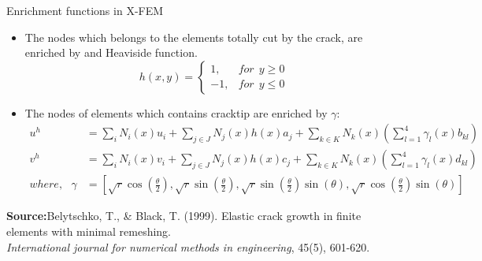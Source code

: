 \documentclass{beamer}
\begin{document}
\begin{frame}[t,fragile]{Enrichment functions in X-FEM}
    \vspace{-.3cm}
     \footnotesize
    \begin{itemize}
        \item The nodes which belongs to the elements totally cut by the crack, are enriched by and Heaviside function.
    $$h(x,y)=\begin{cases}1,&       for ~ ~ y\ge 0\\ -1,&       for~ ~ y\le 0\end{cases}$$
\item The nodes of elements which contains cracktip are enriched by $\gamma$:
     \footnotesize
    \begin{align*}
     u^h&=\sum_i N_i(x)u_i+\sum_{j\in J} N_j(x) h(x)a_j+\sum_{k\in K} N_k(x)\left( \sum_{l=1}^{4}\gamma_l(x)b_{kl} \right) \\
    v^h&=\sum_i N_i(x)v_i+\sum_{j\in J} N_j(x) h(x)c_j+\sum_{k\in K} N_k(x)\left( \sum_{l=1}^{4}\gamma_l(x)d_{kl} \right) \\ 
     where,\ \ \ \gamma&=\left[ \sqrt{r}\cos \left( \frac{\theta}{2} \right), \sqrt{r}\sin\left( \frac{\theta}{2} \right),\sqrt{r}\sin\left( \frac{\theta}{2} \right)\sin(\theta),\sqrt{r}\cos\left( \frac{\theta}{2} \right)\sin(\theta)\right] 
\end{align*}
\end{itemize}
\tiny
\hspace{10pt}
\textbf{Source:}Belytschko, T., \& Black, T. (1999). Elastic crack growth in finite elements with minimal remeshing. \\
\vspace{-7pt}
\hspace{10pt}
\emph{International journal for numerical methods in engineering}, 45(5), 601-620.
\end{frame}
\end{document}
